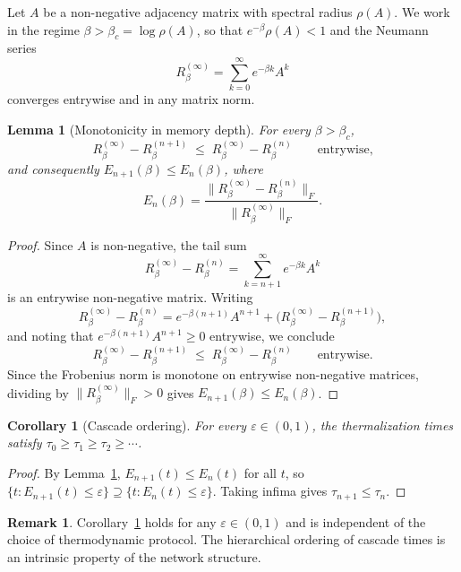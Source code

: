 \documentclass[aps,superscriptaddress,11pt]{revtex4-2}
\newtheorem{lemma}[theorem]{Lemma}
\newtheorem{corollary}[theorem]{Corollary}
\theoremstyle{definition}
\newtheorem{remark}[theorem]{Remark}
\theoremstyle{plain}
\begin{document}
Let $A$ be a non-negative adjacency matrix with spectral radius $\rho(A)$.
We work in the regime $\beta>\beta_c=\log\rho(A)$, so that
$e^{-\beta}\rho(A)<1$ and the Neumann series
\[
  R_\beta^{(\infty)}
  =
  \sum_{k=0}^{\infty}e^{-\beta k}A^k
\]
converges entrywise and in any matrix norm.

\begin{lemma}[Monotonicity in memory depth]
\label{lem:monotone}
For every $\beta>\beta_c$,
\[
  R_\beta^{(\infty)}-R_\beta^{(n+1)}
  \;\leq\;
  R_\beta^{(\infty)}-R_\beta^{(n)}
  \qquad\text{entrywise,}
\]
and consequently $E_{n+1}(\beta)\leq E_n(\beta)$, where
\[
  E_n(\beta)
  =
  \frac{\|R_\beta^{(\infty)}-R_\beta^{(n)}\|_F}
       {\|R_\beta^{(\infty)}\|_F}.
\]
\end{lemma}

\begin{proof}
Since $A$ is non-negative, the tail sum
\[
  R_\beta^{(\infty)}-R_\beta^{(n)}
  =
  \sum_{k=n+1}^{\infty}e^{-\beta k}A^k
\]
is an entrywise non-negative matrix. Writing
\[
  R_\beta^{(\infty)}-R_\beta^{(n)}
  =
  e^{-\beta(n+1)}A^{n+1}
  +
  \bigl(R_\beta^{(\infty)}-R_\beta^{(n+1)}\bigr),
\]
and noting that $e^{-\beta(n+1)}A^{n+1}\geq 0$ entrywise, we conclude
\[
  R_\beta^{(\infty)}-R_\beta^{(n+1)}
  \;\leq\;
  R_\beta^{(\infty)}-R_\beta^{(n)}
  \qquad\text{entrywise.}
\]
Since the Frobenius norm is monotone on entrywise non-negative matrices,
dividing by $\|R_\beta^{(\infty)}\|_F>0$ gives $E_{n+1}(\beta)\leq
E_n(\beta)$.
\end{proof}

\begin{corollary}[Cascade ordering]
\label{cor:cascade_order}
For every $\varepsilon\in(0,1)$, the thermalization times satisfy
$\tau_0\geq \tau_1\geq \tau_2\geq\cdots$.
\end{corollary}

\begin{proof}
By Lemma~\ref{lem:monotone}, $E_{n+1}(t)\leq E_n(t)$ for all $t$, so
$\{t:E_{n+1}(t)\leq\varepsilon\}\supseteq\{t:E_n(t)\leq\varepsilon\}$.
Taking infima gives $\tau_{n+1}\leq\tau_n$.
\end{proof}

\begin{remark}
Corollary~\ref{cor:cascade_order} holds for any $\varepsilon\in(0,1)$
and is independent of the choice of thermodynamic protocol. The
hierarchical ordering of cascade times is an intrinsic property of the
network structure.
\end{remark}
\end{document}
